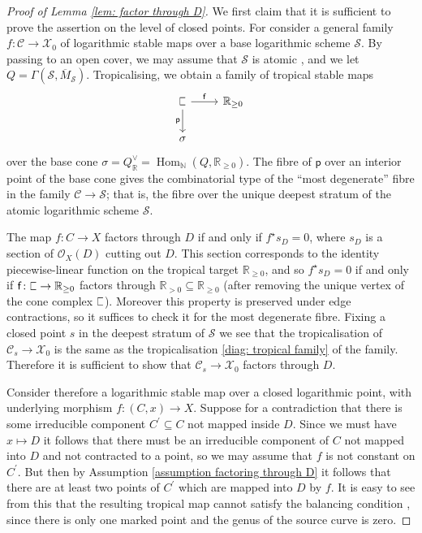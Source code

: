 \documentclass[11pt]{amsart}
\theoremstyle{definition}
\theoremstyle{definition}
\DeclareMathOperator{\Hom}{Hom}
\newcommand{\RR}{\mathbb{R}}
\newcommand{\sqC}{\scalebox{0.8}[1.2]{$\sqsubset$}}
\newcommand{\ol}[1]{\overline{#1}}
\newcommand{\OO}{\mathcal{O}}
\newcommand{\N}{\mathbb{N}}
\newcommand{\Xcal}{\mathcal{X}}
\newcommand{\Ccal}{\mathcal{C}}
\begin{document}
\begin{proof}[Proof of Lemma \ref{lem: factor through D}] We first claim that it is sufficient to prove the assertion on the level of closed points. For consider a general family $f \colon \Ccal \to \Xcal_0$ of logarithmic stable maps over a base logarithmic scheme $\mathcal{S}$. By passing to an open cover, we may assume that $\mathcal{S}$ is atomic \cite[\S 2.2]{AbramovichWiseBirational}, and we let $Q = \Gamma(\mathcal{S},\ol{M}_{\mathcal{S}})$. Tropicalising, we obtain a family of tropical stable maps
\begin{equation} \label{diag: tropical family}
\begin{tikzcd}
\sqC \ar[r,"\mathsf{f}"] \ar[d,"\mathsf{p}" left] & \RR_{\geq 0} \\
\sigma & 
\end{tikzcd}
\end{equation}
over the base cone $\sigma = Q^\vee_{\RR} = \Hom_{\N}(Q,\RR_{\geq 0})$. The fibre of $\mathsf{p}$ over an interior point of the base cone gives the combinatorial type of the ``most degenerate'' fibre in the family $\Ccal \to \mathcal{S}$; that is, the fibre over the unique deepest stratum of the atomic logarithmic scheme $\mathcal{S}$.

The map $f \colon C \to X$ factors through $D$ if and only if $f^\star s_D=0$, where $s_D$ is a section of $\OO_X(D)$ cutting out $D$. This section corresponds to the identity piecewise-linear function on the tropical target $\RR_{\geq 0}$, and so $f^\star s_D=0$ if and only if $\mathsf{f} \colon \sqC \to \RR_{\geq 0}$ factors through $\RR_{>0} \subseteq \RR_{\geq 0}$ (after removing the unique vertex of the cone complex $\sqC$). Moreover this property is preserved under edge contractions, so it suffices to check it for the most degenerate fibre. Fixing a closed point $s$ in the deepest stratum of $\mathcal{S}$ we see that the tropicalisation of $\Ccal_s \to \Xcal_0$ is the same as the tropicalisation \eqref{diag: tropical family} of the family. Therefore it is sufficient to show that $\Ccal_s \to \Xcal_0$ factors through $D$.

Consider therefore a logarithmic stable map over a closed logarithmic point, with underlying morphism $f \colon (C,x) \to X$. Suppose for a contradiction that there is some irreducible component $C^\prime \subseteq C$ not mapped inside $D$. Since we must have $x \mapsto D$ it follows that there must be an irreducible component of $C$ not mapped into $D$ and not contracted to a point, so we may assume that $f$ is not constant on $C^\prime$. But then by Assumption \ref{assumption factoring through D} it follows that there are at least two points of $C^\prime$ which are mapped into $D$ by $f$. It is easy to see from this that the resulting tropical map cannot satisfy the balancing condition \cite[\S 1.4]{GrossSiebertLog}, since there is only one marked point and the genus of the source curve is zero.\end{proof}
\end{document}
